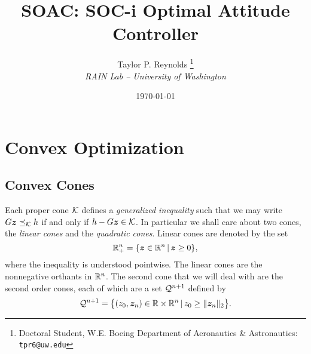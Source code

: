 \documentclass[12pt]{article}
\title{SOAC: SOC-i Optimal Attitude Controller}
\author{
  Taylor P. Reynolds%
  \thanks{Doctoral Student, W.E. Boeing Department of Aeronautics \& Astronautics: \texttt{tpr6@uw.edu} } 
\\
  {\normalsize\itshape
  RAIN Lab -- University of Washington}
 }
\date{\today}
\begin{document}
 
\maketitle

\section{Convex Optimization}

\subsection{Convex Cones}

Each proper cone $\mathcal{K}$ defines a \textit{generalized inequality} such that we may write $G \bm{z} \preceq_{\mathcal{K}} h$ if and only if $h - G \bm{z} \in \mathcal{K}$. In particular we shall care about two cones, the \textit{linear cones} and the \textit{quadratic cones}. Linear cones are denoted by the set 
\begin{equation}
{\mathbb{R}}_+^{n} = \{ \bm{z}\in{\mathbb{R}}^n \,|\, \bm{z} \geq 0 \},
\label{eq:lcone_set}
\end{equation}
where the inequality is understood pointwise. The linear cones are the nonnegative orthants in ${\mathbb{R}}^n$. The second cone that we will deal with are the second order cones, each of which are a set $\mathcal{Q}^{n+1}$ defined by
\begin{equation}
\mathcal{Q}^{n+1} = \big\{ (z_0,\bm{z}_n)\in{\mathbb{R}}\times{\mathbb{R}}^n \,|\, z_0 \geq \| \bm{z}_n \|_2 \big\}.
\label{eq:soc_set}
\end{equation}
\end{document}
